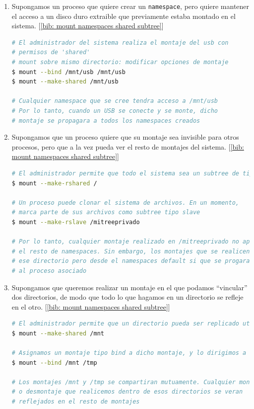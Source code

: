 \documentclass[12pt]{article}
\begin{document}
	\begin{enumerate}
		\item Supongamos un proceso que quiere crear un \texttt{namespace}, pero quiere mantener el acceso a un disco duro extraible que previamente estaba montado en el sistema. [\ref{bib: mount namespaces shared subtree}]
		
		\begin{lstlisting}[language=bash, caption={Caso de uso de \texttt{shared subtree}}]
# El administrador del sistema realiza el montaje del usb con 
# permisos de 'shared'
# mount sobre mismo directorio: modificar opciones de montaje
$ mount --bind /mnt/usb /mnt/usb
$ mount --make-shared /mnt/usb
			
# Cualquier namespace que se cree tendra acceso a /mnt/usb
# Por lo tanto, cuando un USB se conecte y se monte, dicho 
# montaje se propagara a todos los namespaces creados
		\end{lstlisting}
	
		\item Supongamos que un proceso quiere que su montaje sea invisible para otros procesos, pero que a la vez pueda ver el resto de montajes del sistema. [\ref{bib: mount namespaces shared subtree}]
		
		\begin{lstlisting}[language=bash, caption={Caso de uso de \texttt{slave mount}}]
# El administrador permite que todo el sistema sea un subtree de tipo shared
$ mount --make-rshared /
			
# Un proceso puede clonar el sistema de archivos. En un momento, 
# marca parte de sus archivos como subtree tipo slave
$ mount --make-rslave /mitreeprivado
			
# Por lo tanto, cualquier montaje realizado en /mitreeprivado no aparecera en 
# el resto de namespaces. Sin embargo, los montajes que se realicen en 
# ese directorio pero desde el namespaces default si que se progaran 
# al proceso asociado
		\end{lstlisting}
	
		\item Supongamos que queremos realizar un montaje en el que podamos ``vincular'' dos directorios, de modo que todo lo que hagamos en un directorio se refleje en el otro. [\ref{bib: mount namespaces shared subtree}]
		
		\begin{lstlisting}[language=bash, caption={Caso de uso de \texttt{bind} y \texttt{shared subtree}}]
# El administrador permite que un directorio pueda ser replicado utilizando el tipo shared
$ mount --make-shared /mnt

# Asignamos un montaje tipo bind a dicho montaje, y lo dirigimos a otro directorio
$ mount --bind /mnt /tmp

# Los montajes /mnt y /tmp se compartiran mutuamente. Cualquier montaje 
# o desmontaje que realicemos dentro de esos directorios se veran
# reflejados en el resto de montajes
		\end{lstlisting}

	\end{enumerate}
\end{document}
